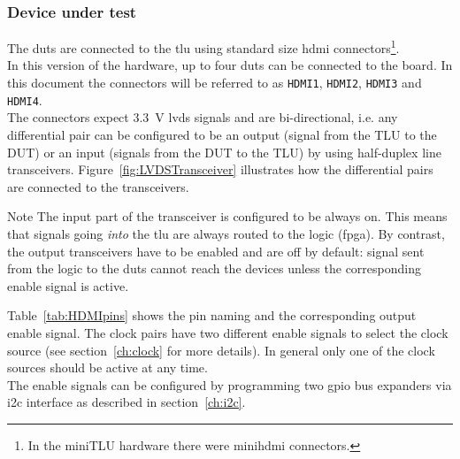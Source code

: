\subsubsection{Device under test}\label{ch:dut}
The \gls{dut}s are connected to the \gls{tlu} using standard size \gls{hdmi} connectors\footnote{In the miniTLU hardware there were mini\gls{hdmi} connectors.}.\\
In this version of the hardware, up to four \gls{dut}s can be connected to the board. In this document the connectors will be referred to as \verb|HDMI1|, \verb|HDMI2|, \verb|HDMI3| and \verb|HDMI4|.\\
The connectors expect 3.3~V \gls{lvds} signals and are bi-directional, i.e. any differential pair can be configured to be an output (signal from the TLU to the DUT) or an input (signals from the DUT to the TLU) by using half-duplex line transceivers. Figure~\ref{fig:LVDSTransceiver} illustrates how the differential pairs are connected to the transceivers.
\begin{alertinfo}{Note}
    The input part of the transceiver is configured to be always on. This means that signals going \emph{into} the \gls{tlu} are always routed to the logic (\gls{fpga}). By contrast, the output transceivers have to be enabled and are off by default: signal sent from the logic to the \gls{dut}s cannot reach the devices unless the corresponding enable signal is active.
\end{alertinfo}
Table~\ref{tab:HDMIpins} shows the pin naming and the corresponding output enable signal. The clock pairs have two different enable signals to select the clock source (see section~\ref{ch:clock} for more details). In general only one of the clock sources should be active at any time.\\
The enable signals can be configured by programming two \gls{gpio} bus expanders via \gls{i2c} interface as described in section~\ref{ch:i2c}.

